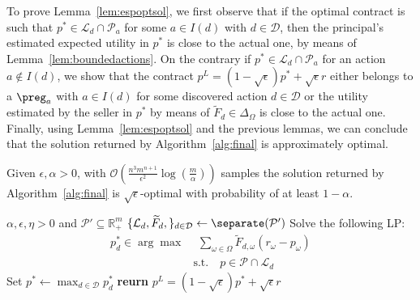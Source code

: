 To prove Lemma~\ref{lem:espoptsol}, we first observe that if the optimal contract is such that $p^* \in \mathcal{L}_{d} \cap \mathcal{P}_a$ for some $a \in I(d)$ with $d \in \mathcal{D}$, then the principal's estimated expected utility in $p^*$ is close to the actual one, by means of Lemma~\ref{lem:boundedactions}. On the contrary if $p^* \in \mathcal{L}_{d} \cap \mathcal{P}_a$ for an action $a \not \in I(d)$, we show that the contract $p^L = (1 -\sqrt{\epsilon}) p^* + \sqrt{\epsilon} r $ either belongs to a $\preg_{a}$ with $a \in I(d)$ for some discovered action $d \in \mathcal{D}$ or the utility estimated by the seller in $p^*$ by means of $\widetilde{F}_{d} \in \Delta_{\Omega}$ is close to the actual one. Finally, using Lemma~\ref{lem:espoptsol} and the previous lemmas, we can conclude that the solution returned by Algorithm~\ref{alg:final} is approximately optimal.

\begin{theorem}
Given $\epsilon, \alpha > 0 $, with $\mathcal{O}(\frac{n^3m^{n+1}}{\epsilon^2}\log(\frac{m}{\alpha})) $ samples the solution returned by Algorithm~\ref{alg:final} is $\sqrt{ \epsilon}$-optimal with probability of at least $1-\alpha$.
\end{theorem}

\begin{algorithm}
\caption{\texttt{FIND-CONTRACT}}
\label{alg:find_contract}
\begin{algorithmic}[1]
\Require $\alpha, \epsilon, \eta>0$ and $\mathcal{P}' \subseteq \mathbb{R}^m_{+}$
\State $\{ \mathcal{L}_{d} , \widetilde{F}_d,\}_{d \in \mathcal{D}}\leftarrow\separate (\mathcal{P}')$
\State Solve the following LP:
\begin{subequations}
\begin{align*}
p_{d}^* \in \arg \max & \,\ \sum_{\omega  \in \Omega }  \widetilde{F}_{d,\omega}    \left( r_\omega - p_\omega \right)  \label{eq:utility}\\
& \text{s.t.} \quad p \in \mathcal{P} \cap \mathcal{L}_{d} 
\end{align*}
\end{subequations}
\EndWhile
\State Set $p^* \leftarrow \max_{d \in \mathcal{D}} p^*_{d}$
\State \textbf{reurn} $p^L = (1 -\sqrt{\epsilon}) p^* + \sqrt{\epsilon} r $
\end{algorithmic}
\end{algorithm}



\clearpage
\hrulefill

